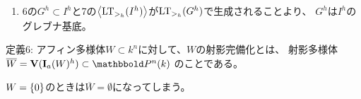 \begin{myproof}
\begin{enumerate}
\begin{enumerate}
{      斉次化では次数は変わらないので、非斉次化→斉次化だと次数は落ちており、$x_0^e$を補わないとまずい。}
      」より、
      \begin{align}
        F= x_0^e\cdot  f^h
      \end{align}
      となる$e \in \Zge$がある。
      \item
      4より、
      \begin{align}
        \LM_{>_h}(F)
        \desceq{(h)}
        x_0^e \cdot \LM_{>_h}(f^h)
        \desceq{4}
        x_0^e \cdot \LM_{>}(f).
      \end{align}
      \item $\exists i$:
      $G$は$I$のグレブナ基底であることと、
      (g)で$f\in I$であることより、
      $\LM_>(f)$はある$\LM_>(g_i)$で割り切れる。
      \item 上と、4の$\LM_>(g_i) = \LM_{>_h}(g_i^h)$
      より、$\LM_{>}(F)$は$\LM_{>_h}(g_i^h)$で割り切れる。
      \item (a)おわり: 任意の$\LM_>(F) \in \LT_{>_h}(I^h)$は
      $\LM_{>_h}(g_i^h)$の倍数になっている。示された。
    \end{enumerate}
    $\gen{\LT_{>_h}(I^h)}$は$\LT_{>_h}(G^h)$で生成される。
    \item
    6の$G^h \subset I^h$と7の$\gen{\LT_{>_h}(I^h)}$が$\LT_{>_h}(G^h)$で生成されることより、
    $G^h$は$I^h$のグレブナ基底。
  \end{enumerate}
\end{myproof}

\begin{framed}
  定義6:
  アフィン多様体$W\subset k^n$に対して、$W$の射影完備化とは、
  射影多様体$\overline{W} = \var(\ideal_a(W)^h)\subset \P^n(k)$
  のことである。
\end{framed}
$W=\{0\}$のときは$\overline W = \emptyset$になってしまう。

